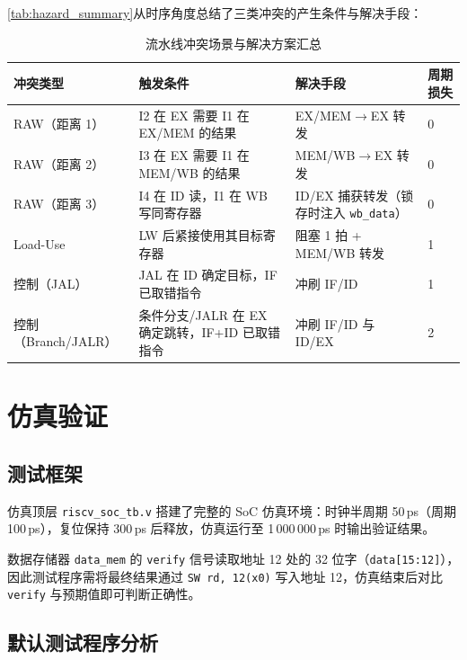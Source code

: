 \documentclass[12pt,hyperref,a4paper,UTF8]{ctexart}
\begin{document}
\autoref{tab:hazard_summary}从时序角度总结了三类冲突的产生条件与解决手段：

\begin{table}[H]
    \centering
    \caption{流水线冲突场景与解决方案汇总}
    \label{tab:hazard_summary}
    \begin{tabular}{llll}
        \toprule
        冲突类型 & 触发条件 & 解决手段 & 周期损失 \\
        \midrule
        RAW（距离 1）  & I2 在 EX 需要 I1 在 EX/MEM 的结果 & EX/MEM$\rightarrow$EX 转发 & 0 \\
        RAW（距离 2）  & I3 在 EX 需要 I1 在 MEM/WB 的结果 & MEM/WB$\rightarrow$EX 转发 & 0 \\
        RAW（距离 3）  & I4 在 ID 读，I1 在 WB 写同寄存器    & ID/EX 捕获转发（锁存时注入 \texttt{wb\_data}）& 0 \\
        Load-Use       & LW 后紧接使用其目标寄存器            & 阻塞 1 拍 + MEM/WB 转发 & 1 \\
        控制（JAL）    & JAL 在 ID 确定目标，IF 已取错指令   & 冲刷 IF/ID & 1 \\
        控制（Branch/JALR）& 条件分支/JALR 在 EX 确定跳转，IF+ID 已取错指令 & 冲刷 IF/ID 与 ID/EX & 2 \\
        \bottomrule
    \end{tabular}
\end{table}

\section{仿真验证}

\subsection{测试框架}

仿真顶层 \texttt{riscv\_soc\_tb.v} 搭建了完整的 SoC 仿真环境：时钟半周期 50\,ps（周期 100\,ps），复位保持 300\,ps 后释放，仿真运行至 1\,000\,000\,ps 时输出验证结果。

数据存储器 \texttt{data\_mem} 的 \texttt{verify} 信号读取地址 12 处的 32 位字（\texttt{data[15:12]}），因此测试程序需将最终结果通过 \texttt{SW rd, 12(x0)} 写入地址 12，仿真结束后对比 \texttt{verify} 与预期值即可判断正确性。

\subsection{默认测试程序分析}
\end{document}
